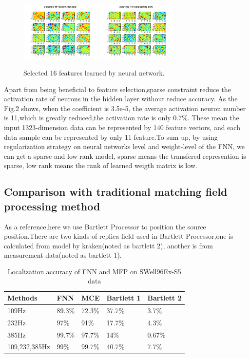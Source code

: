 \begin{figure}
\includegraphics[width=4cm,height=3cm]{figure/selected_16_features_real_part}
\includegraphics[width=4cm,height=3cm]{figure/selected_16_features_imag_part}
\caption{Selected 16 features learned by neural network.}
\end{figure}

Apart from being beneficial to feature selection,sparse constraint reduce the activation rate of neurons in the hidden layer without reduce accuracy. As the Fig.2 shows, when the coefficient is 3.5e-5, the average activation neuron number is 11,which is greatly reduced,the activation rate is only 0.7{\%}.
These mean the input 1323-dimension data can be represented by 140 feature vectors, and each data sample can be represented by only 11 feature.To sum up, by using regularization strategy on neural networks level and weight-level of the FNN, we can get a sparse and low rank model, sparse means the transfered represention is sparse, low rank means the rank of learned weigth matrix is low. 

\subsection{Comparison with traditional matching field processing method}
As a reference,here we use Bartlett Processor to position the source position.There are two kinds of replica-field used in Bartlett Processor,one is calculated from model by kraken(noted as bartlett 2), another is from measurement data(noted as bartlett 1).
\begin{table}[]
\caption{Localization accuracy of FNN and MFP on SWell96Ex-S5 data}
\label{my-label}
\begin{tabular}{@{}lllll@{}}
\toprule
Methods       & FNN    & MCE    & Bartlett 1 & Bartlett 2 \\ \midrule
109Hz         & 89.3\% & 72.3\% & 37.7\%     & 3.7\%      \\
232Hz         & 97\%   & 91\%   & 17.7\%     & 4.3\%      \\
385Hz         & 99.7\% & 97.7\% & 14\%       & 0.67\%     \\
109,232,385Hz & 99\%   & 99.7\% & 40.7\%     & 7.7\%      \\ \bottomrule
\end{tabular}
\end{table}

